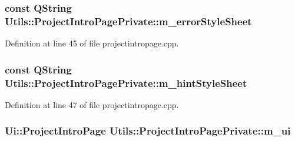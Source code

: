 \hypertarget{struct_utils_1_1_project_intro_page_private_ae97c602c737715475e942302671f5aaf}{
\subsubsection[{m\-\_\-error\-Style\-Sheet}]{\setlength{\rightskip}{0pt plus 5cm}const {\bf \-Q\-String} {\bf \-Utils\-::\-Project\-Intro\-Page\-Private\-::m\-\_\-error\-Style\-Sheet}}}\label{struct_utils_1_1_project_intro_page_private_ae97c602c737715475e942302671f5aaf}


\-Definition at line 45 of file projectintropage.\-cpp.

\hypertarget{struct_utils_1_1_project_intro_page_private_a0bff93c252b31403685c055919bd6256}{
\subsubsection[{m\-\_\-hint\-Style\-Sheet}]{\setlength{\rightskip}{0pt plus 5cm}const {\bf \-Q\-String} {\bf \-Utils\-::\-Project\-Intro\-Page\-Private\-::m\-\_\-hint\-Style\-Sheet}}}\label{struct_utils_1_1_project_intro_page_private_a0bff93c252b31403685c055919bd6256}


\-Definition at line 47 of file projectintropage.\-cpp.

\hypertarget{struct_utils_1_1_project_intro_page_private_a8b58b2c9069e4ea0e1dbf49d0588f17e}{
\subsubsection[{m\-\_\-ui}]{\setlength{\rightskip}{0pt plus 5cm}\-Ui\-::\-Project\-Intro\-Page {\bf \-Utils\-::\-Project\-Intro\-Page\-Private\-::m\-\_\-ui}}}\label{struct_utils_1_1_project_intro_page_private_a8b58b2c9069e4ea0e1dbf49d0588f17e}


